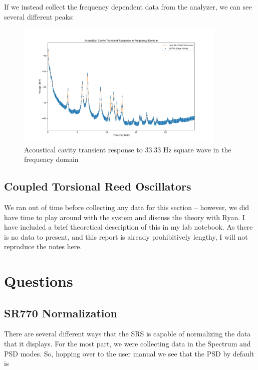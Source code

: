 \documentclass{article}
\begin{document}
If we instead collect the frequency dependent data from the analyzer, we can
see several different peaks:

\begin{figure}[H]
    \centering
\begin{minipage}{11cm}
\begin{tcolorbox}
    \centering
        \includegraphics[width=10cm, height=6cm]{figures/figure34.png}
        \caption{Acoustical cavity transient response to 33.33 Hz square wave
        in the frequency domain}
        \label{fig:fig34}
\end{tcolorbox}
\end{minipage}
\end{figure}

\subsection{Coupled Torsional Reed Oscillators}%
\label{sub:coupled_torsional_reed_oscillators}

We ran out of time before collecting any data for this section -- however, we
did have time to play around with the system and discuss the theory with Ryan.
I have included a brief theoretical description of this in my lab notebook. As
there is no data to present, and this report is already prohibitively lengthy,
I will not reproduce the notes here. 

\section{Questions}%
\label{sec:questions}

\subsection{SR770 Normalization}%
\label{sub:sr770_normalization}

There are several different ways that the SRS is capable of normalizing the
data that it displays. For the most part, we were collecting data in the
Spectrum and PSD modes. So, hopping over to the user manual we see that the PSD
by default is 
\end{document}
